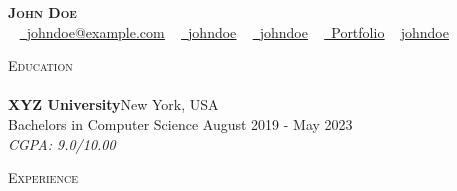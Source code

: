 \documentclass[a4paper,10.85pt]{article}
\newcommand{\lineunder} {
    \vspace*{-8pt} \\
    \hspace*{-18pt} \hrulefill \\
}
\newcommand{\header} [1] {
    {\hspace*{-18pt}\vspace*{6pt} \textsc{#1}}
    \vspace*{-6pt} \lineunder
}
\begin{document}
\vspace*{-30pt}

\begin{center}
{\Huge \scshape \textbf {John Doe}}\\
\vspace*{1pt}
~ \href{mailto:johndoe@example.com}{\raisebox{-0.2\height}\faEnvelope\  \underline{johndoe@example.com}} ~ 
\href{https://www.linkedin.com/in/manishtiwari13/}{\raisebox{-0.2\height}\faLinkedin\ \underline{johndoe}}  ~
\href{https://github.com/manish-9245}{\raisebox{-0.2\height}\faGithub\ \underline{johndoe}} ~ 
\href{https://portfolio.johndoe.com}{\raisebox{-0.2\height}\faGlobe\ \underline{Portfolio}}  ~
\href{https://leetcode.com/johndoe/}{ \underline{johndoe}}
\vspace{-5pt}
\end{center}

\header{Education}
\vspace{2mm}
\textbf{XYZ University}\hfill New York, USA\\
Bachelors in Computer Science \hfill August 2019 - May 2023\\
{\sl CGPA: 9.0/10.00}\\
\vspace{1.5mm}

\header{Experience}
\vspace{2mm}
\end{document}
